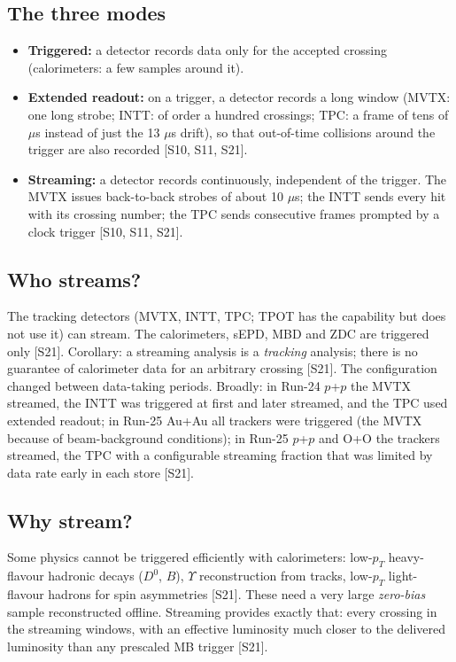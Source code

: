 \documentclass[11pt,letterpaper]{article}
\begin{document}
\subsection{The three modes}
\begin{itemize}
\item \textbf{Triggered:} a detector records data only for the accepted crossing (calorimeters: a few samples around it).
\item \textbf{Extended readout:} on a trigger, a detector records a long window (MVTX: one long strobe; INTT: of order a hundred crossings; TPC: a frame of tens of $\mu$s instead of just the 13 $\mu$s drift), so that out-of-time collisions around the trigger are also recorded [S10, S11, S21].
\item \textbf{Streaming:} a detector records continuously, independent of the trigger. The MVTX issues back-to-back strobes of about 10 $\mu$s; the INTT sends every hit with its crossing number; the TPC sends consecutive frames prompted by a clock trigger [S10, S11, S21].
\end{itemize}

\subsection{Who streams?}
The tracking detectors (MVTX, INTT, TPC; TPOT has the capability but does not use it) can stream. The calorimeters, sEPD, MBD and ZDC are triggered only [S21].
Corollary: a streaming analysis is a \emph{tracking} analysis; there is no guarantee of calorimeter data for an arbitrary crossing [S21].
The configuration changed between data-taking periods. Broadly: in Run-24 $p$+$p$ the MVTX streamed, the INTT was triggered at first and later streamed, and the TPC used extended readout; in Run-25 Au+Au all trackers were triggered (the MVTX because of beam-background conditions); in Run-25 $p$+$p$ and O+O the trackers streamed, the TPC with a configurable streaming fraction that was limited by data rate early in each store [S21].

\subsection{Why stream?}
Some physics cannot be triggered efficiently with calorimeters: low-$p_T$ heavy-flavour hadronic decays ($D^0$, $B$), $\Upsilon$ reconstruction from tracks, low-$p_T$ light-flavour hadrons for spin asymmetries [S21].
These need a very large \emph{zero-bias} sample reconstructed offline.
Streaming provides exactly that: every crossing in the streaming windows, with an effective luminosity much closer to the delivered luminosity than any prescaled MB trigger [S21].
\end{document}
